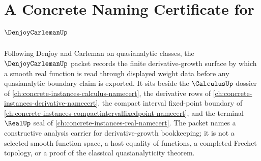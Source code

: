 \chapter{A Concrete Naming Certificate for $\DenjoyCarlemanUp$}
\label{ch:concrete-instances-denjoy-carleman-namecert}

Following Denjoy and Carleman on quasianalytic classes, the $\DenjoyCarlemanUp$ packet records the finite derivative-growth surface by which a smooth real function is read through displayed weight data before any quasianalytic boundary claim is exported. It sits beside the $\CalculusUp$ dossier of \autoref{ch:concrete-instances-calculus-namecert}, the derivative rows of \autoref{ch:concrete-instances-derivative-namecert}, the compact interval fixed-point boundary of \autoref{ch:concrete-instances-compactintervalfixedpoint-namecert}, and the terminal $\RealUp$ seal of \autoref{ch:concrete-instances-real-namecert}. The packet names a constructive analysis carrier for derivative-growth bookkeeping; it is not a selected smooth function space, a host equality of functions, a completed Frechet topology, or a proof of the classical quasianalyticity theorem.

